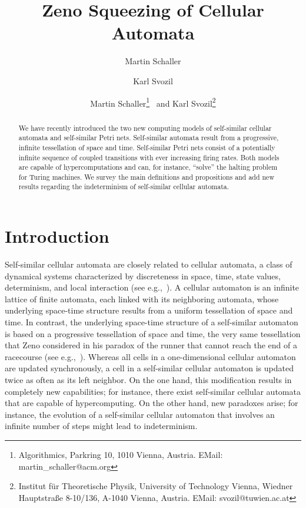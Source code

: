 \documentclass{article}
\theoremstyle{definition}
\begin{document}
\sloppy

\title{Zeno Squeezing of Cellular Automata}
\author{Martin Schaller}
\author{Karl Svozil}

\author{
Martin Schaller\thanks{
             Algorithmics,
						 Parkring 10, 1010  Vienna, Austria.
             EMail: martin\_schaller@acm.org}
               \, and
Karl Svozil\thanks{
             Institut f\"ur Theoretische Physik, University of Technology Vienna,
						 Wiedner Hauptstra\ss e 8-10/136, A-1040 Vienna, Austria.
             EMail: svozil@tuwien.ac.at}
}


\maketitle

\begin{abstract}
We have recently  introduced the two new computing models of self-similar cellular automata and self-similar Petri nets.
Self-similar automata result from a progressive, infinite tessellation of space and time.
Self-similar Petri nets consist of a potentially infinite sequence of coupled transitions with ever
increasing firing rates.
Both models are capable of hypercomputations and can, for instance, ``solve'' the halting problem for Turing machines.
We survey the main definitions and propositions and add new results regarding the indeterminism of
self-similar cellular automata.
\end{abstract}

\section{Introduction}

Self-similar cellular automata are closely related to cellular automata, a class of dynamical systems
characterized by discreteness in space, time, state values, determinism,
and local interaction (see e.g.,~\cite{gutowitz91}).
A cellular automaton is an infinite lattice of finite automata, each linked with its neighboring automata,
whose underlying space-time structure results from a uniform tessellation of space and time.
In contrast, the underlying space-time structure of a self-similar automaton
is based on a progressive tessellation of space and time, the very same tessellation
that Zeno considered in his paradox of the runner that cannot reach the end of a racecourse
(see e.g.,~\cite{salmon-01}).
Whereas all cells in a one-dimensional cellular automaton are updated synchronously, a cell in
a self-similar cellular automaton is updated twice as often as its left neighbor.
On the one hand, this modification results in completely new capabilities; for instance, there exist
self-similar cellular automata that are capable of hypercomputing.
On the other hand, new paradoxes arise; for instance, the evolution of a self-similar
cellular automaton that involves an infinite number of steps might lead to indeterminism.
\end{document}
